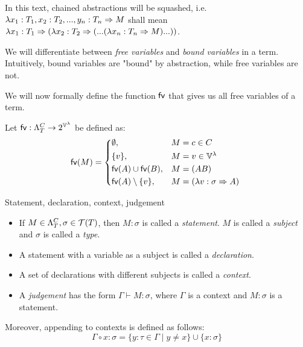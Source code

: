 \documentclass[main.tex]{subfiles}
\begin{document}
\begin{convention}
    In this text, chained abstractions will be squashed, i.e.
    $\lambda x_1 : T_1, x_2: T_2, ..., y_n: T_n \abstr M$ shall mean
    $\lambda x_1 : T_1 \abstr (\lambda x_2: T_2 \abstr (... (\lambda x_n: T_n \abstr M) ...))$.
\end{convention}

We will differentiate between \emph{free variables} and \emph{bound variables}
in a term. Intuitively, bound variables are "bound" by abstraction, while
free variables are not.

We will now formally define the function $\fvv$ that gives us all free variables of a
term.
\begin{defn}
    Let $\fvv : \plambda{T}{C} \fun 2^{\lvars}$ be defined as:
    \[
        \fv{M} =
        \begin{cases*}
            \emptyset ,& $M = c \in C$ \\
            \{ v \} ,& $M = v \in \lvars$ \\
            \fv{A} \cup \fv{B} ,& $M = (AB)$ \\
            \fv{A} \setminus \{ v \} ,& $M = (\lambda v : \sigma \abstr A)$ \\
        \end{cases*}
    \]
\end{defn}

\begin{defn}
    \label{def:context}
    Statement, declaration, context, judgement \cite[chap.~2.4]{ttfp}
    \begin{itemize}
        \item If $M \in \plambda{T}{C}, \sigma \in \tclos{T}$, then $M : \sigma$ is called
            a \emph{statement}. $M$ is called a \emph{subject} and $\sigma$
            is called a \emph{type}.
        \item A statement with a variable as a subject is called a \emph{declaration}.
        \item A set of declarations with different subjects is called a \emph{context}.
        \item A \emph{judgement} has the form $\Gamma \vdash M: \sigma$, where
            $\Gamma$ is a context and $M: \sigma$ is a statement.
    \end{itemize}

    Moreover, appending to contexts is defined as follows:
    \[ \Gamma \circ x : \sigma = \{ y : \tau \in \Gamma \mid y \neq x \}
       \cup \{ x : \sigma \} \]
\end{defn}
\end{document}
